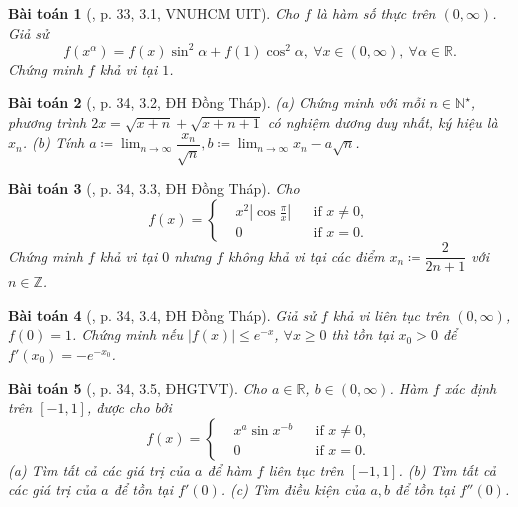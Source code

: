\documentclass{article}
\newtheorem{baitoan}{Bài toán}
\begin{document}
\begin{baitoan}[\cite{VMS_VMC2024}, p. 33, 3.1, VNUHCM UIT]
	Cho $f$ là hàm số thực trên $(0,\infty)$. Giả sử
	\begin{equation*}
		f(x^\alpha) = f(x)\sin^2\alpha + f(1)\cos^2\alpha,\ \forall x\in(0,\infty),\ \forall\alpha\in\mathbb{R}.
	\end{equation*}
	Chứng minh $f$ khả vi tại $1$.
\end{baitoan}

\begin{baitoan}[\cite{VMS_VMC2024}, p. 34, 3.2, ĐH Đồng Tháp]
	(a) Chứng minh với mỗi $n\in\mathbb{N}^\star$, phương trình $2x = \sqrt{x + n} + \sqrt{x + n + 1}$ có nghiệm dương duy nhất, ký hiệu là $x_n$. (b) Tính $a\coloneqq\lim_{n\to\infty} \dfrac{x_n}{\sqrt{n}},b\coloneqq \lim_{n\to\infty} x_n - a\sqrt{n}$.
\end{baitoan}

\begin{baitoan}[\cite{VMS_VMC2024}, p. 34, 3.3, ĐH Đồng Tháp]
	Cho
	\begin{equation*}
		f(x) = \left\{\begin{split}
			&x^2\left|\cos\frac{\pi}{x}\right|&&\mbox{if } x\ne0,\\
			&0&&\mbox{if } x = 0.
		\end{split}\right.
	\end{equation*}
	Chứng minh $f$ khả vi tại $0$ nhưng $f$ không khả vi tại các điểm $x_n\coloneqq\dfrac{2}{2n + 1}$ với $n\in\mathbb{Z}$.
\end{baitoan}

\begin{baitoan}[\cite{VMS_VMC2024}, p. 34, 3.4, ĐH Đồng Tháp]
	Giả sử $f$ khả vi liên tục trên $(0,\infty)$, $f(0) = 1$. Chứng minh nếu $|f(x)|\le e^{-x}$, $\forall x\ge0$ thì tồn tại $x_0 > 0$ để $f'(x_0) = -e^{-x_0}$.
\end{baitoan}

\begin{baitoan}[\cite{VMS_VMC2024}, p. 34, 3.5, ĐHGTVT]
	Cho $a\in\mathbb{R}$, $b\in(0,\infty)$. Hàm $f$ xác định trên $[-1,1]$, được cho bởi
	\begin{equation*}
		f(x) = \left\{\begin{split}
			&x^a\sin x^{-b}&&\mbox{if } x\ne0,\\
			&0&&\mbox{if } x = 0.
		\end{split}\right.
	\end{equation*}
	(a) Tìm tất cả các giá trị của $a$ để hàm $f$ liên tục trên $[-1,1]$. (b) Tìm tất cả các giá trị của $a$ để tồn tại $f'(0)$. (c) Tìm điều kiện của $a,b$ để tồn tại $f''(0)$.
\end{baitoan}
\end{document}
